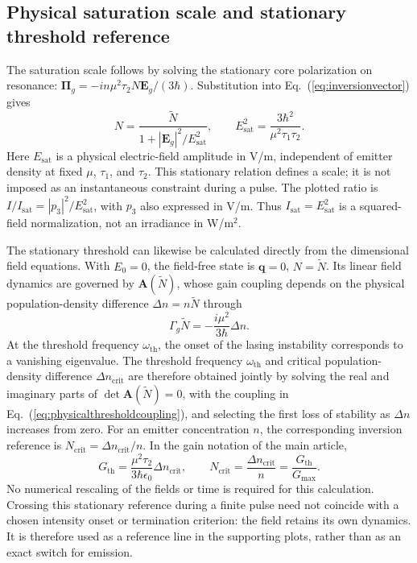 \documentclass[9pt]{osa-supplemental-document}
\begin{document}
\subsection{Physical saturation scale and stationary threshold reference}
The saturation scale follows by solving the stationary core polarization on resonance: $\bm\Pi_g=-in\mu^2\tau_2N\mathbf E_g/(3\hbar)$. Substitution into Eq.~(\ref{eq:inversionvector}) gives
\begin{equation}
N=\frac{\widetilde N}{1+|\mathbf E_g|^2/E_{\mathrm{sat}}^2},\qquad
E_{\mathrm{sat}}^2=\frac{3\hbar^2}{\mu^2\tau_1\tau_2}.
\label{eq:saturation}
\end{equation}
Here $E_{\mathrm{sat}}$ is a physical electric-field amplitude in V/m, independent of emitter density at fixed $\mu$, $\tau_1$, and $\tau_2$. This stationary relation defines a scale; it is not imposed as an instantaneous constraint during a pulse. The plotted ratio is $I/I_{\mathrm{sat}}=|p_3|^2/E_{\mathrm{sat}}^2$, with $p_3$ also expressed in V/m. Thus $I_{\mathrm{sat}}=E_{\mathrm{sat}}^2$ is a squared-field normalization, not an irradiance in W/m$^2$.

The stationary threshold can likewise be calculated directly from the dimensional field equations. With $E_0=0$, the field-free state is $\mathbf q=0$, $N=\widetilde N$. Its linear field dynamics are governed by $\mathbf A(\widetilde N)$, whose gain coupling depends on the physical population-density difference $\Delta n=n\widetilde N$ through
\begin{equation}
\Gamma_g\widetilde N=-\frac{i\mu^2}{3\hbar}\Delta n.
\label{eq:physicalthresholdcoupling}
\end{equation}
At the threshold frequency $\omega_{\mathrm{th}}$, the onset of the lasing instability corresponds to a vanishing eigenvalue. The threshold frequency $\omega_{\mathrm{th}}$ and critical population-density difference $\Delta n_{\mathrm{crit}}$ are therefore obtained jointly by solving the real and imaginary parts of $\det\mathbf A(\widetilde N)=0$, with the coupling in Eq.~(\ref{eq:physicalthresholdcoupling}), and selecting the first loss of stability as $\Delta n$ increases from zero. For an emitter concentration $n$, the corresponding inversion reference is $N_{\mathrm{crit}}=\Delta n_{\mathrm{crit}}/n$. In the gain notation of the main article,
\begin{equation}
G_{\mathrm{th}}=\frac{\mu^2\tau_2}{3\hbar\epsilon_0}\Delta n_{\mathrm{crit}},\qquad
N_{\mathrm{crit}}=\frac{\Delta n_{\mathrm{crit}}}{n}=\frac{G_{\mathrm{th}}}{G_{\max}}.
\label{eq:thresholdreference}
\end{equation}
No numerical rescaling of the fields or time is required for this calculation. Crossing this stationary reference during a finite pulse need not coincide with a chosen intensity onset or termination criterion: the field retains its own dynamics. It is therefore used as a reference line in the supporting plots, rather than as an exact switch for emission.
\end{document}
